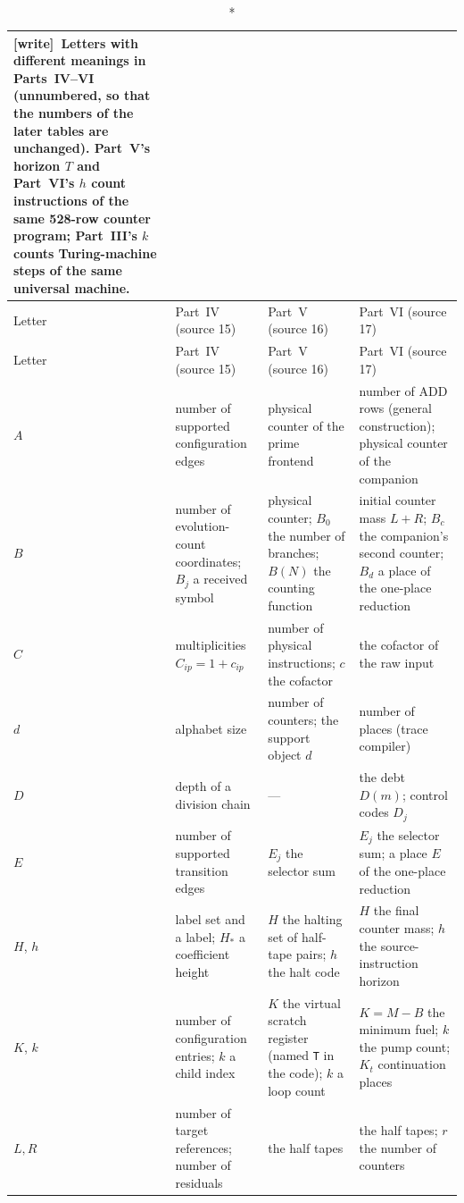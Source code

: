 \documentclass[11pt,letterpaper]{article}
\theoremstyle{definition}
\theoremstyle{remark}
\newcommand{\wtag}{\textup{[write]}}
\begin{document}
\begingroup{}%
\begin{longtable}{@{}L{0.07\textwidth}L{0.28\textwidth}L{0.28\textwidth}L{0.28\textwidth}@{}}
\caption*{\wtag\ \textbf{Letters with different meanings in Parts~IV--VI} (unnumbered, so that the numbers of the later tables are unchanged). Part~V's horizon $T$ and Part~VI's $h$ count instructions of the same 528-row counter program; Part~III's $k$ counts Turing-machine steps of the same universal machine.}\\
\toprule
Letter & Part~IV (source 15) & Part~V (source 16) & Part~VI (source 17)\\\midrule\endfirsthead
\toprule
Letter & Part~IV (source 15) & Part~V (source 16) & Part~VI (source 17)\\\midrule\endhead
$A$ & number of supported configuration edges & physical counter of the prime frontend & number of ADD rows (general construction); physical counter of the companion \\
$B$ & number of evolution-count coordinates; $B_j$ a received symbol & physical counter; $B_0$ the number of branches; $B(N)$ the counting function & initial counter mass $L+R$; $B_c$ the companion's second counter; $B_d$ a place of the one-place reduction \\
$C$ & multiplicities $C_{ip}=1+c_{ip}$ & number of physical instructions; $c$ the cofactor & the cofactor of the raw input \\
$d$ & alphabet size & number of counters; the support object $d$ & number of places (trace compiler) \\
$D$ & depth of a division chain & --- & the debt $D(m)$; control codes $D_j$ \\
$E$ & number of supported transition edges & $E_j$ the selector sum & $E_j$ the selector sum; a place $E$ of the one-place reduction \\
$H$, $h$ & label set and a label; $H_*$ a coefficient height & $H$ the halting set of half-tape pairs; $h$ the halt code & $H$ the final counter mass; $h$ the source-instruction horizon \\
$K$, $k$ & number of configuration entries; $k$ a child index & $K$ the virtual scratch register (named \texttt{T} in the code); $k$ a loop count & $K=M-B$ the minimum fuel; $k$ the pump count; $K_t$ continuation places \\
$L,R$ & number of target references; number of residuals & the half tapes & the half tapes; $r$ the number of counters \\

\end{longtable}
\end{document}

